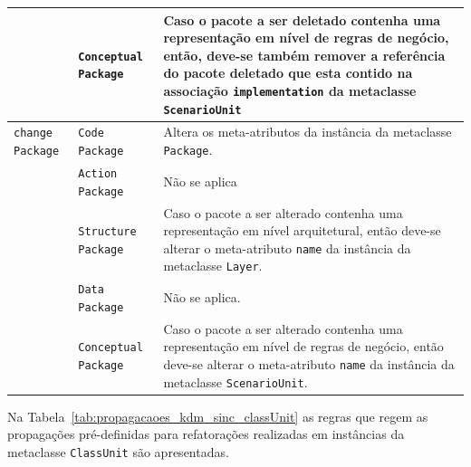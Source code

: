 \begin{longtable}{ | m{1.9cm} | m{3.57cm}| m{9.3cm} | }
\cline{2-3}
& \texttt{Conceptual Package} & Caso o pacote a ser deletado contenha uma representação em nível de regras de negócio, então, deve-se também remover a referência do pacote deletado que esta contido na associação \texttt{implementation} da metaclasse \texttt{ScenarioUnit} \tabularnewline
\hline
\texttt{change} \texttt{Package} & \texttt{Code Package} & Altera os meta-atributos da instância da metaclasse \texttt{Package}.\tabularnewline
\cline{2-3}
& \texttt{Action Package} & Não se aplica \tabularnewline
\cline{2-3}
& \texttt{Structure Package} & Caso o pacote a ser alterado contenha uma representação em nível arquitetural, então deve-se alterar o meta-atributo \texttt{name} da instância da metaclasse \texttt{Layer}. \tabularnewline
\cline{2-3}
& \texttt{Data Package} & Não se aplica. \tabularnewline
\cline{2-3}
& \texttt{Conceptual Package} & Caso o pacote a ser alterado contenha uma representação em nível de regras de negócio, então deve-se alterar o meta-atributo \texttt{name} da instância da metaclasse \texttt{ScenarioUnit}. \tabularnewline
 \end{longtable}

Na Tabela~\ref{tab:propagacaoes_kdm_sinc_classUnit} as regras que regem as propagações pré-definidas para refatorações realizadas em instâncias da metaclasse \texttt{ClassUnit} são apresentadas.

